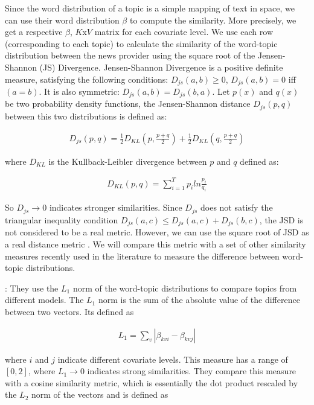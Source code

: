 \documentclass[12pt,a4paper,notitlepage]{article}
\begin{document}
Since the word distribution of a topic is a simple mapping of text in space, we can use their word distribution $\beta$ to compute the similarity. More precisely, we get a respective $\beta$, $K$x$V$ matrix for each covariate level. We use each row (corresponding to each topic) to calculate the similarity of the word-topic distribution between the news provider using the square root of the Jensen-Shannon (JS) Divergence. Jensen-Shannon Divergence is a positive definite measure, satisfying the following conditions: $D_{js}(a,b) \geq 0$, $D_{js}(a,b)=0$ iff $(a=b)$. It is also symmetric: $D_{js}(a,b)=D_{js}(b,a)$. Let $p(x)$ and $q(x)$ be two probability density functions, the Jensen-Shannon distance $D_{js}(p,q)$ between this two distributions is defined as:

\begin{align*}
	D_{js}(p,q)=\frac{1}{2}D_{KL}(p,\frac{p+q}{2})+\frac{1}{2}D_{KL}(q,\frac{p+q}{2})
\end{align*}

where $D_{KL}$ is the Kullback-Leibler divergence between $p$ and $q$ defined as:

\begin{align*}
	D_{KL}(p,q)=\sum_{i=1}^T p_i ln \frac{p_i}{q_i}
\end{align*}

So $D_{js} \to 0$ indicates stronger similarities. Since $D_{js}$ does not satisfy the triangular inequality condition $D_{js}(a,c)\leq D_{js}(a,c)+D_{js}(b,c)$, the JSD is not considered to be a real metric. However, we can use the square root of JSD as a real distance metric \citep{endres_new_2003}. We will compare this metric with a set of other similarity measures recently used in the literature to measure the difference between word-topic distributions. 

\citep{roberts_navigating_2016}: They use the $L_1$ norm of the word-topic distributions to compare topics from different models. The $L_1$ norm is the sum of the absolute value of the difference between two vectors. Its defined as

\begin{align*}
	L_1=\sum_v |\beta_{kvi}-\beta_{kvj}|
\end{align*}

where $i$ and $j$ indicate different covariate levels. This measure has a range of $[0,2]$, where $ L_1 \rightarrow 0$ indicates strong similarities. They compare this measure with a cosine similarity metric, which is essentially the dot product rescaled by the $L_2$ norm of the vectors and is defined as
\end{document}
